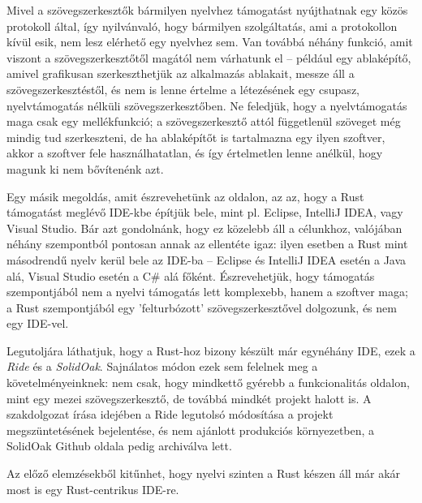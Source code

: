 Mivel a szövegszerkesztők bármilyen nyelvhez támogatást nyújthatnak egy közös protokoll által, így nyilvánvaló, hogy bármilyen szolgáltatás, ami a protokollon kívül esik, nem lesz elérhető egy nyelvhez sem. 
Van továbbá néhány funkció, amit viszont a szövegszerkesztőtől magától nem várhatunk el -- 
például egy ablaképítő, amivel grafikusan szerkeszthetjük az alkalmazás ablakait, messze áll a szövegszerkesztéstől, és nem is lenne értelme a létezésének egy csupasz, nyelvtámogatás nélküli szövegszerkesztőben. 
Ne feledjük, hogy a nyelvtámogatás maga csak egy mellékfunkció; 
a szövegszerkesztő attól függetlenül szöveget még mindig tud szerkeszteni, de ha ablaképítőt is tartalmazna egy ilyen szoftver, akkor a szoftver fele használhatatlan, és így értelmetlen lenne anélkül, hogy magunk ki nem bővítenénk azt.

Egy másik megoldás, amit észrevehetünk az oldalon, az az, hogy a Rust támogatást meglévő IDE-kbe építjük bele, mint pl. Eclipse, IntelliJ IDEA, vagy Visual Studio. 
Bár azt gondolnánk, hogy ez közelebb áll a célunkhoz, valójában néhány szempontból pontosan annak az ellentéte igaz: ilyen esetben a Rust mint másodrendű nyelv kerül bele az IDE-ba -- 
Eclipse és IntelliJ IDEA esetén a Java alá, Visual Studio esetén a C\# alá főként. 
Észrevehetjük, hogy támogatás szempontjából nem a nyelvi támogatás lett komplexebb, hanem a szoftver maga; 
a Rust szempontjából egy 'felturbózott' szövegszerkesztővel dolgozunk, és nem egy IDE-vel.

Legutoljára láthatjuk, hogy a Rust-hoz bizony készült már egynéhány IDE, ezek a \emph{Ride}\cite{ride} és a \emph{SolidOak}\cite{solidoak}. 
Sajnálatos módon ezek sem felelnek meg a követelményeinknek: nem csak, hogy mindkettő gyérebb a funkcionalitás oldalon, mint egy mezei szövegszerkesztő, de továbbá mindkét projekt halott is. 
A szakdolgozat írása idejében a Ride legutolsó módosítása a projekt megszüntetésének bejelentése, és nem ajánlott produkciós környezetben, a SolidOak Github oldala pedig archiválva lett.


Az előző elemzésekből kitűnhet, hogy nyelvi szinten a Rust készen áll már akár most is egy Rust-centrikus IDE-re. 

